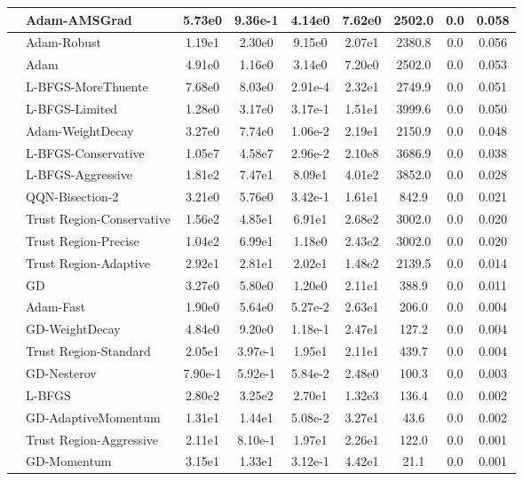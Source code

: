 \documentclass[10pt]{article}
\begin{document}
\begin{longtable}{|l|l|c|c|c|c|c|c|c|}
\hline
 & Adam-AMSGrad & 5.73e0 & 9.36e-1 & 4.14e0 & 7.62e0 & 2502.0 & 0.0 & 0.058 \\
\hline
 & Adam-Robust & 1.19e1 & 2.30e0 & 9.15e0 & 2.07e1 & 2380.8 & 0.0 & 0.056 \\
\hline
 & Adam & 4.91e0 & 1.16e0 & 3.14e0 & 7.20e0 & 2502.0 & 0.0 & 0.053 \\
\hline
 & L-BFGS-MoreThuente & 7.68e0 & 8.03e0 & 2.91e-4 & 2.32e1 & 2749.9 & 0.0 & 0.051 \\
\hline
 & L-BFGS-Limited & 1.28e0 & 3.17e0 & 3.17e-1 & 1.51e1 & 3999.6 & 0.0 & 0.050 \\
\hline
 & Adam-WeightDecay & 3.27e0 & 7.74e0 & 1.06e-2 & 2.19e1 & 2150.9 & 0.0 & 0.048 \\
\hline
 & L-BFGS-Conservative & 1.05e7 & 4.58e7 & 2.96e-2 & 2.10e8 & 3686.9 & 0.0 & 0.038 \\
\hline
 & L-BFGS-Aggressive & 1.81e2 & 7.47e1 & 8.09e1 & 4.01e2 & 3852.0 & 0.0 & 0.028 \\
\hline
 & QQN-Bisection-2 & 3.21e0 & 5.76e0 & 3.42e-1 & 1.61e1 & 842.9 & 0.0 & 0.021 \\
\hline
 & Trust Region-Conservative & 1.56e2 & 4.85e1 & 6.91e1 & 2.68e2 & 3002.0 & 0.0 & 0.020 \\
\hline
 & Trust Region-Precise & 1.04e2 & 6.99e1 & 1.18e0 & 2.43e2 & 3002.0 & 0.0 & 0.020 \\
\hline
 & Trust Region-Adaptive & 2.92e1 & 2.81e1 & 2.02e1 & 1.48e2 & 2139.5 & 0.0 & 0.014 \\
\hline
 & GD & 3.27e0 & 5.80e0 & 1.20e0 & 2.11e1 & 388.9 & 0.0 & 0.011 \\
\hline
 & Adam-Fast & 1.90e0 & 5.64e0 & 5.27e-2 & 2.63e1 & 206.0 & 0.0 & 0.004 \\
\hline
 & GD-WeightDecay & 4.84e0 & 9.20e0 & 1.18e-1 & 2.47e1 & 127.2 & 0.0 & 0.004 \\
\hline
 & Trust Region-Standard & 2.05e1 & 3.97e-1 & 1.95e1 & 2.11e1 & 439.7 & 0.0 & 0.004 \\
\hline
 & GD-Nesterov & 7.90e-1 & 5.92e-1 & 5.84e-2 & 2.48e0 & 100.3 & 0.0 & 0.003 \\
\hline
 & L-BFGS & 2.80e2 & 3.25e2 & 2.70e1 & 1.32e3 & 136.4 & 0.0 & 0.002 \\
\hline
 & GD-AdaptiveMomentum & 1.31e1 & 1.44e1 & 5.08e-2 & 3.27e1 & 43.6 & 0.0 & 0.002 \\
\hline
 & Trust Region-Aggressive & 2.11e1 & 8.10e-1 & 1.97e1 & 2.26e1 & 122.0 & 0.0 & 0.001 \\
\hline
 & GD-Momentum & 3.15e1 & 1.33e1 & 3.12e-1 & 4.42e1 & 21.1 & 0.0 & 0.001 \\

\end{longtable}
\end{document}
